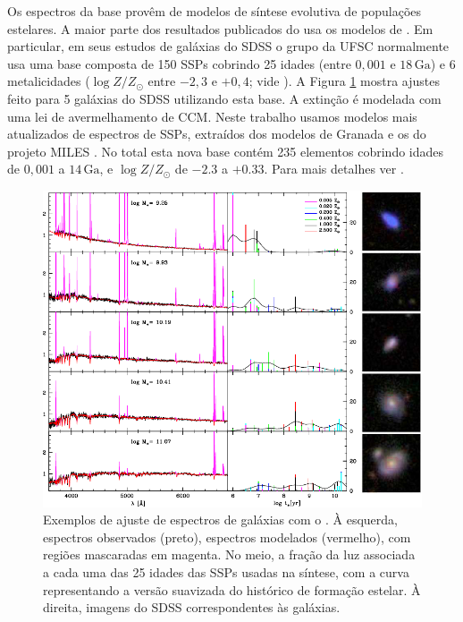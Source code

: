 Os espectros da base provêm de modelos de síntese evolutiva de populações
estelares. A maior parte dos resultados publicados do \starlight usa os modelos
de \citet[BC03]{Bruzual2003}. Em particular, em seus estudos de galáxias do SDSS
o grupo da UFSC normalmente usa uma base composta de 150 SSPs cobrindo 25 idades
(entre $0,001$ e $18\,\mathrm{Ga}$) e 6 metalicidades ($\log Z/Z_\odot$ entre
$-2,3$ e $+0,4$; vide \citet{Mateus2006}). A Figura
\ref{fig:StarlightSpectrumSample} mostra ajustes feito para 5 galáxias do SDSS
utilizando esta base. A extinção é modelada com uma lei de avermelhamento de
CCM. Neste trabalho usamos modelos mais atualizados de espectros de SSPs,
extraídos dos modelos de Granada \citep[para idades até
$63\,\mathrm{Ma}$]{GonzalezDelgado2005} e os do projeto MILES \citep[para idades
maiores que $63\,\mathrm{Ma}$]{Vazdekis2010}. No total esta nova base contém 235
elementos cobrindo idades de  $0,001$ a $14\,\mathrm{Ga}$, e $\log Z/Z_\odot$ de
$-2.3$ a $+0.33$.
Para mais detalhes ver \citet{GonzalezDelgado2014b, GonzalezDelgado2014a}.

\begin{figure}
	\includegraphics[width=1.0\textwidth]{figuras/starlight-fit}
	\caption[Exemplos de ajuste de espectro com o \starlight]
	{Exemplos de ajuste de espectros de galáxias com o \starlight
	\citep{Asari2007}. À esquerda, espectros observados (preto), espectros
	modelados (vermelho), com regiões mascaradas em magenta. No meio, a fração da
	luz associada a cada uma das 25 idades das SSPs usadas na síntese, com a curva
	representando a versão suavizada do histórico de formação estelar. À direita,
	imagens do SDSS correspondentes às galáxias.}
	\label{fig:StarlightSpectrumSample}
\end{figure}


